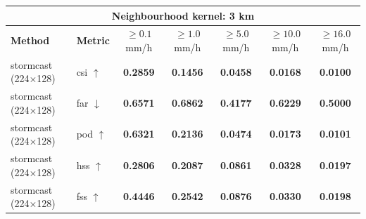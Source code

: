 \documentclass[border=10pt]{standalone}
\begin{document}
\begin{tabular}{llccccc}
\toprule
\multicolumn{7}{c}{\textbf{Neighbourhood kernel: 3 km}} \\
\midrule
\textbf{Method} & \textbf{Metric} & $\geq 0.1$ mm/h & $\geq 1.0$ mm/h & $\geq 5.0$ mm/h & $\geq 10.0$ mm/h & $\geq 16.0$ mm/h \\
\midrule
stormcast (224$\times$128) & csi $\uparrow$ & \textbf{0.2859} & \textbf{0.1456} & \textbf{0.0458} & \textbf{0.0168} & \textbf{0.0100} \\
\midrule
stormcast (224$\times$128) & far $\downarrow$ & \textbf{0.6571} & \textbf{0.6862} & \textbf{0.4177} & \textbf{0.6229} & \textbf{0.5000} \\
\midrule
stormcast (224$\times$128) & pod $\uparrow$ & \textbf{0.6321} & \textbf{0.2136} & \textbf{0.0474} & \textbf{0.0173} & \textbf{0.0101} \\
\midrule
stormcast (224$\times$128) & hss $\uparrow$ & \textbf{0.2806} & \textbf{0.2087} & \textbf{0.0861} & \textbf{0.0328} & \textbf{0.0197} \\
\midrule
stormcast (224$\times$128) & fss $\uparrow$ & \textbf{0.4446} & \textbf{0.2542} & \textbf{0.0876} & \textbf{0.0330} & \textbf{0.0198} \\
\bottomrule
\end{tabular}
\end{document}
